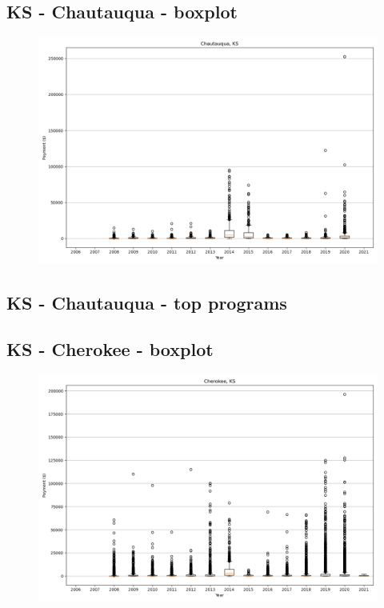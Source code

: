 \subsection*{KS - Chautauqua - boxplot}
\begin{figure}[h]
\centering
\includegraphics[width=7in]{../output/boxplots/counties/Chautauqua-KS_boxplot.png}
\end{figure}


\subsection*{KS - Chautauqua - top programs}

\newpage
\subsection*{KS - Cherokee - boxplot}
\begin{figure}[h]
\centering
\includegraphics[width=7in]{../output/boxplots/counties/Cherokee-KS_boxplot.png}
\end{figure}


